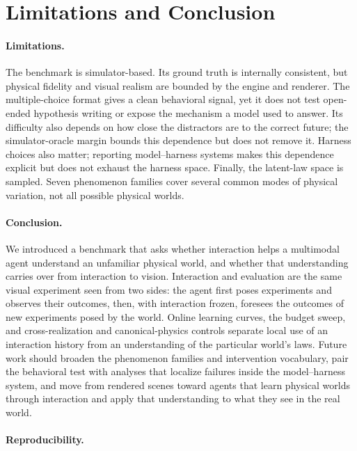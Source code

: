 \section{Limitations and Conclusion}
\label{sec:conclusion}

\paragraph{Limitations.} The benchmark is simulator-based. Its ground truth is internally consistent, but physical fidelity and visual realism are bounded by the engine and renderer. The multiple-choice format gives a clean behavioral signal, yet it does not test open-ended hypothesis writing or expose the mechanism a model used to answer. Its difficulty also depends on how close the distractors are to the correct future; the simulator-oracle margin bounds this dependence but does not remove it. Harness choices also matter; reporting model--harness systems makes this dependence explicit but does not exhaust the harness space. Finally, the latent-law space is sampled. Seven phenomenon families cover several common modes of physical variation, not all possible physical worlds. 

\paragraph{Conclusion.} We introduced a benchmark that asks whether interaction helps a multimodal agent understand an unfamiliar physical world, and whether that understanding carries over from interaction to vision. Interaction and evaluation are the same visual experiment seen from two sides: the agent first poses experiments and observes their outcomes, then, with interaction frozen, foresees the outcomes of new experiments posed by the world. Online learning curves, the budget sweep, and cross-realization and canonical-physics controls separate local use of an interaction history from an understanding of the particular world's laws.  Future work should broaden the phenomenon families and intervention vocabulary, pair the behavioral test with analyses that localize failures inside the model--harness system, and move from rendered scenes toward agents that learn physical worlds through interaction and apply that understanding to what they see in the real world.

\paragraph{Reproducibility.} 
